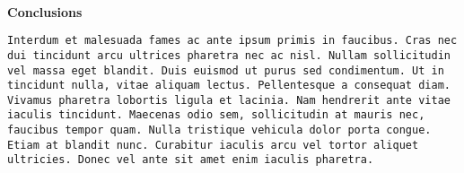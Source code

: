 \documentclass[11pt]{article}
\begin{document}
\hfill \\
{\bfseries\large Conclusions}
\begin{lstlisting}[mathescape]
Interdum et malesuada fames ac ante ipsum primis in faucibus. Cras nec dui tincidunt arcu ultrices pharetra nec ac nisl. Nullam sollicitudin vel massa eget blandit. Duis euismod ut purus sed condimentum. Ut in tincidunt nulla, vitae aliquam lectus. Pellentesque a consequat diam. Vivamus pharetra lobortis ligula et lacinia. Nam hendrerit ante vitae iaculis tincidunt. Maecenas odio sem, sollicitudin at mauris nec, faucibus tempor quam. Nulla tristique vehicula dolor porta congue. Etiam at blandit nunc. Curabitur iaculis arcu vel tortor aliquet ultricies. Donec vel ante sit amet enim iaculis pharetra.
\end{lstlisting}
\hfill \\
\end{document}
